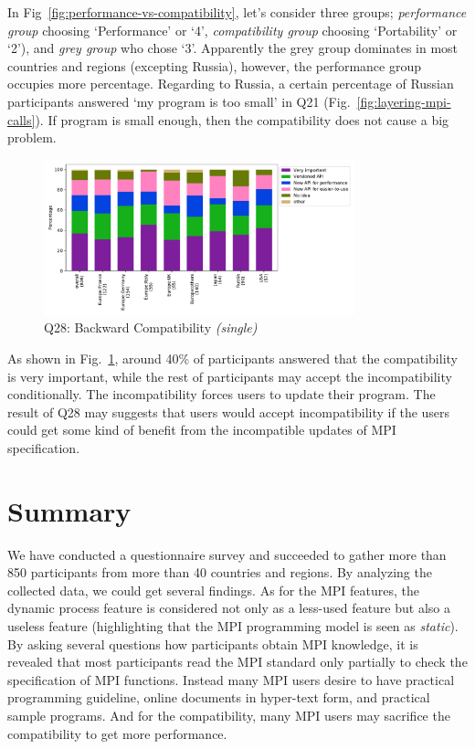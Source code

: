 \documentclass[conference,10pt,letterpaper]{IEEEtran}
\def\myquote#1{`#1'}
\begin{document}
In Fig~\ref{fig:performance-vs-compatibility}, let's consider three
groups; {\it performance group} choosing \myquote{Performance} or
\myquote{4}, {\it compatibility group} choosing \myquote{Portability} or
\myquote{2}), and {\it grey group} who chose \myquote{3}. Apparently the grey
group dominates in most countries and regions (excepting Russia),
however, the performance group occupies more percentage. Regarding to
Russia, a certain percentage of Russian participants answered
\myquote{my program is too small} in Q21
(Fig.~\ref{fig:layering-mpi-calls}). If program is small enough, then
the compatibility does not cause a big problem.

\begin{figure}[htb]
\begin{center}
\includegraphics[width=9cm]{Figs/Q28.pdf}
\caption{Q28: Backward Compatibility {\it(single)}}
\label{fig:compatibility}
\end{center}
\end{figure}

As shown in Fig.~\ref{fig:compatibility}, around 40\% of participants
answered that the compatibility is very important, while the rest of
participants may accept the incompatibility conditionally. The
incompatibility forces users to update their program. The result of
Q28 may suggests that users would accept incompatibility if the users
could get some kind of benefit from the incompatible updates of MPI
specification. 

\section{Summary}

We have conducted a questionnaire survey and succeeded to gather more
than 850 participants from more than 40 countries and regions. By
analyzing the collected data, we could get several findings. As for
the MPI features, the dynamic process feature is considered not only
as a less-used feature but also a useless feature (highlighting that
the MPI programming model is seen as {\em static}). By asking several
questions how participants obtain MPI knowledge, it is revealed that
most participants read the MPI standard only partially to check the
specification of MPI functions. Instead many MPI users desire to have
practical programming guideline, online documents in hyper-text form,
and practical sample programs. And for the compatibility, many MPI
users may sacrifice the compatibility to get more performance.
\end{document}
